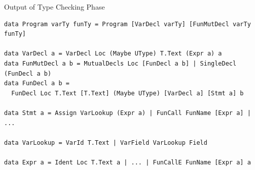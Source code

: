 \documentclass[dvipsnames,aspectratio=169]{beamer}
\begin{document}




\begin{frame}[fragile]{Output of Type Checking Phase}

  \begin{verbatim}
data Program varTy funTy = Program [VarDecl varTy] [FunMutDecl varTy funTy]

data VarDecl a = VarDecl Loc (Maybe UType) T.Text (Expr a) a
data FunMutDecl a b = MutualDecls Loc [FunDecl a b] | SingleDecl (FunDecl a b)
data FunDecl a b =
  FunDecl Loc T.Text [T.Text] (Maybe UType) [VarDecl a] [Stmt a] b

data Stmt a = Assign VarLookup (Expr a) | FunCall FunName [Expr a] | ...

data VarLookup = VarId T.Text | VarField VarLookup Field

data Expr a = Ident Loc T.Text a | ... | FunCallE FunName [Expr a] a
\end{verbatim}

\end{frame}

\end{document}
